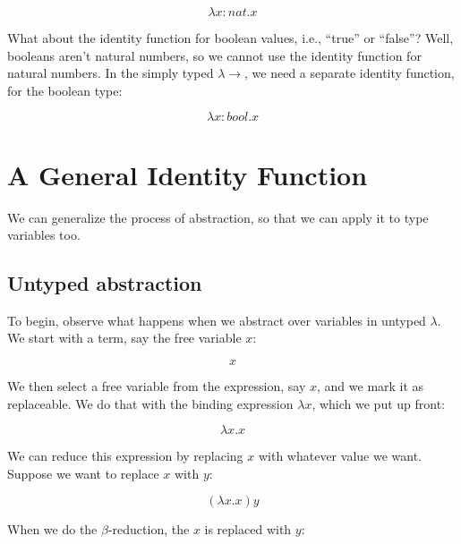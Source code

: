 \documentclass{book}
\numberwithin{equation}{chapter}
\begin{document}
\begin{equation}
\lambda x : nat.x
\end{equation}

\noindent
What about the identity function for boolean values, i.e., ``true'' or ``false''? Well, booleans aren't natural numbers, so we cannot use the identity function for natural numbers. In the simply typed $\lambda\rightarrow$, we need a separate identity function, for the boolean type:

\begin{equation}
\lambda x : bool.x
\end{equation}


\section{A General Identity Function}

We can generalize the process of abstraction, so that we can apply it to type variables too.


\subsection{Untyped abstraction}

To begin, observe what happens when we abstract over variables in untyped $\lambda$. We start with a term, say the free variable $x$:

\begin{equation}
x
\end{equation}

\noindent
We then select a free variable from the expression, say $x$, and we mark it as replaceable. We do that with the binding expression $\lambda x$, which we put up front:

\begin{equation}
\lambda x.x
\end{equation}

\noindent
We can reduce this expression by replacing $x$ with whatever value we want. Suppose we want to replace $x$ with $y$:

\begin{equation}
(\lambda x.x) y
\end{equation}

\noindent
When we do the $\beta$-reduction, the $x$ is replaced with $y$:
\end{document}
